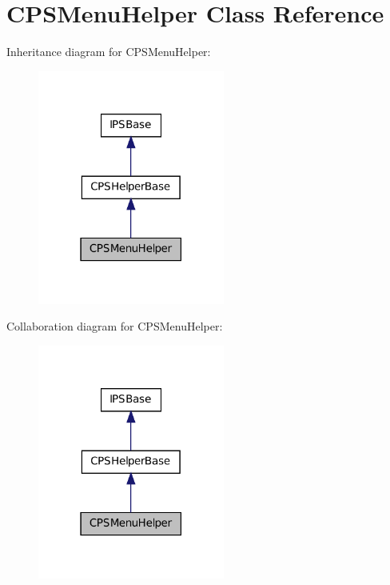 \hypertarget{classCPSMenuHelper}{
\section{CPSMenuHelper Class Reference}
\label{classCPSMenuHelper}
}


Inheritance diagram for CPSMenuHelper:\nopagebreak
\begin{figure}[H]
\begin{center}
\leavevmode
\includegraphics[width=174pt]{classCPSMenuHelper__inherit__graph}
\end{center}
\end{figure}


Collaboration diagram for CPSMenuHelper:\nopagebreak
\begin{figure}[H]
\begin{center}
\leavevmode
\includegraphics[width=174pt]{classCPSMenuHelper__coll__graph}
\end{center}
\end{figure}
